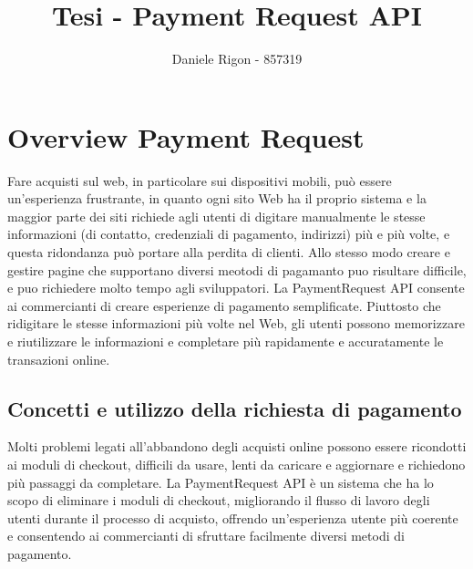 \documentclass[italian]{article}
\author{
	Daniele Rigon - 857319 \\
}
\begin{document}
	
	\title{Tesi - Payment Request API}
	\maketitle
	
	\tableofcontents
	\pagebreak
	
	\section{Overview Payment Request}
	Fare acquisti sul web, in particolare sui dispositivi mobili, può essere un'esperienza frustrante, in quanto ogni sito Web ha il proprio sistema e la maggior parte dei siti richiede agli utenti di digitare manualmente le stesse informazioni (di contatto, credenziali di pagamento, indirizzi) più e più volte, e questa ridondanza può portare alla perdita di clienti.
	Allo stesso modo creare e gestire pagine che supportano diversi meotodi di pagamanto puo risultare difficile, e puo richiedere molto tempo agli sviluppatori.
	La PaymentRequest API consente ai commercianti di creare esperienze di pagamento semplificate. Piuttosto che ridigitare le stesse informazioni più volte nel Web, gli utenti possono memorizzare e riutilizzare le informazioni e completare più rapidamente e accuratamente le transazioni online.
	
	\subsection{Concetti e utilizzo della richiesta di pagamento}
	
	Molti problemi legati all'abbandono degli acquisti online possono essere ricondotti ai moduli di checkout, difficili da usare, lenti da caricare e aggiornare e richiedono più passaggi da completare. La PaymentRequest API è un sistema che ha lo scopo di eliminare i moduli di checkout, migliorando il flusso di lavoro degli utenti durante il processo di acquisto, offrendo un'esperienza utente più coerente e consentendo ai commercianti di sfruttare facilmente diversi metodi di pagamento. 
	
\end{document}
